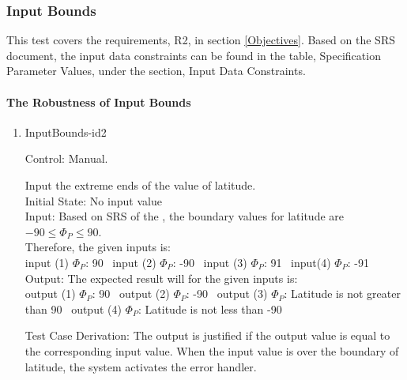 \documentclass[12pt, titlepage]{article}
\begin{document}
\subsubsection{Input Bounds}

This test covers the requirements, R2, in section \ref{Objectives}. Based on
the SRS document\cite{YS2019}, the input data constraints can be found in the
table, Specification Parameter Values, under the section, Input Data
Constraints.

\paragraph{The Robustness of Input Bounds} 
\begin{enumerate}
\item{InputBounds-id2\\} 

Control: Manual. 

Input the extreme ends of the value of latitude.\\
Initial State: No input value\\
Input: Based on SRS \cite{YS2019} of the \progname{} \cite{YS2019}, the boundary
values for latitude are $-90 \leq \Phi_P \leq 90$. \\
Therefore, the given inputs is:\\
input (1) $\Phi_P$: 90 
~input (2) $\Phi_P$: -90 
~input (3) $\Phi_P$: 91 
~input(4) $\Phi_P$: -91\\ 

Output: The expected result will for the given inputs is:\\
output (1) $\Phi_P$: 90 
~output (2) $\Phi_P$: -90 
~output (3) $\Phi_P$: Latitude is not greater than 90 
~output (4) $\Phi_P$: Latitude is not less than -90\\


Test Case Derivation: The output is justified if the output value is equal to
the corresponding input value. When the input value is over the boundary 
of latitude, the system activates the error handler. \\  


\end{enumerate}
\end{document}
